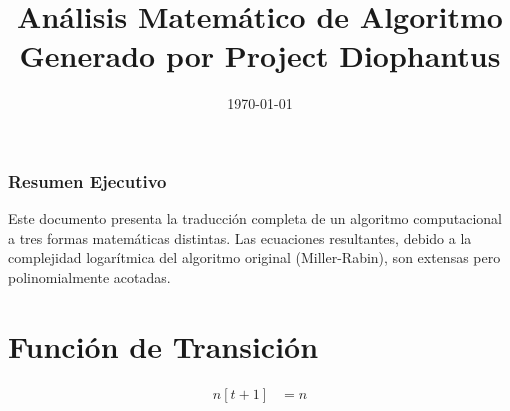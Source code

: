 \documentclass[10pt, a4paper]{article}
\title{Análisis Matemático de Algoritmo \\ \large Generado por Project Diophantus}
\author{}
\date{\today}
\begin{document}
\maketitle
\section*{Resumen Ejecutivo}
Este documento presenta la traducción completa de un algoritmo computacional a tres formas matemáticas distintas.
Las ecuaciones resultantes, debido a la complejidad logarítmica del algoritmo original (Miller-Rabin), son extensas pero polinomialmente acotadas.
\part{Función de Transición}
\begin{align*}
n[t+1] &= n \\

\end{align*}
\end{document}
